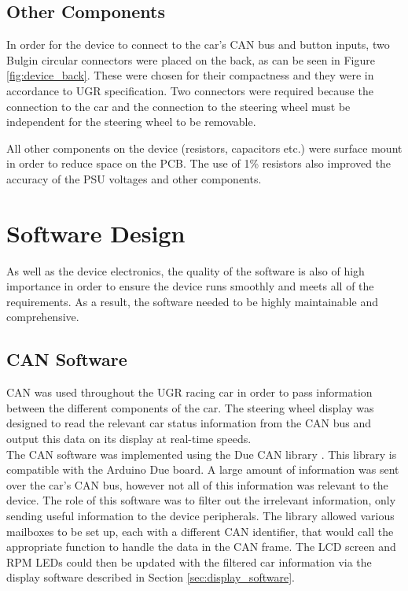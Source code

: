 \documentclass[a4paper,12pt]{article}
\begin{document}


\subsection{Other Components}
\label{sec:other_components}

In order for the device to connect to the car's CAN bus and button inputs, two Bulgin circular connectors were placed on the back, as can be seen in Figure \ref{fig:device_back}. These were chosen for their compactness and they were in accordance to UGR specification. Two connectors were required because the connection to the car and the connection to the steering wheel must be independent for the steering wheel to be removable.



All other components on the device (resistors, capacitors etc.) were surface mount in order to reduce space on the PCB. The use of 1\% resistors also improved the accuracy of the PSU voltages and other components. \\


\newpage
\section{Software Design}
\label{sec:software_design}

As well as the device electronics, the quality of the software is also of high importance in order to ensure the device runs smoothly and meets all of the requirements. As a result, the software needed to be highly maintainable and comprehensive.

\subsection{CAN Software}
\label{sec:CAN_software}

CAN was used throughout the UGR racing car in order to pass information between the different components of the car. The steering wheel display was designed to read the relevant car status information from the CAN bus and output this data on its display at real-time speeds. \\

The CAN software was implemented using the Due CAN library \cite{due_can}. This library is compatible with the Arduino Due board. A large amount of information was sent over the car's CAN bus, however not all of this information was relevant to the device. The role of this software was to filter out the irrelevant information, only sending useful information to the device peripherals. The library allowed various mailboxes to be set up, each with a different CAN identifier, that would call the appropriate function to handle the data in the CAN frame. The LCD screen and RPM LEDs could then be updated with the filtered car information via the display software described in Section \ref{sec:display_software}. \\
\end{document}
